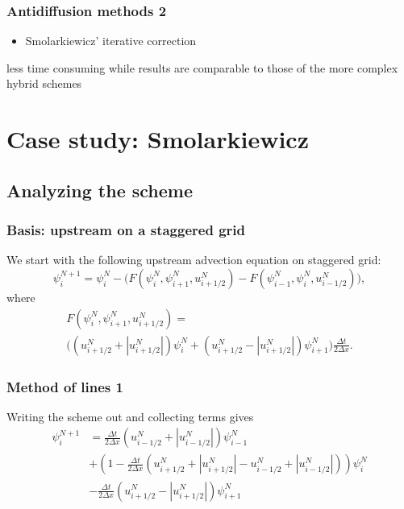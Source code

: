 \documentclass[hyperref={pdfstartview=Fit}]{beamer}
\providecommand{\abs}[1]{\left\lvert#1\right\rvert}
\begin{document}
\begin{frame}
\frametitle{Antidiffusion methods 2}
\begin{itemize}
\item Smolarkiewicz' iterative correction
\end{itemize}
   less time consuming while results are comparable to those of the more complex hybrid schemes
\end{frame}

\section{Case study: Smolarkiewicz}
\subsection{Analyzing the scheme}

\begin{frame}
\frametitle{Basis: upstream on a staggered grid}
We start with the following upstream advection equation on staggered grid:
\begin{equation*}
 \psi_i^{N+1} = \psi_i^N - \Big( F \left( \psi_i^N,\psi_{i+1}^N,u_{i+1/2}^N\right)
-F \left( \psi_{i-1}^N,\psi_{i}^N,u_{i-1/2}^N\right) \Big),
\end{equation*}
where
\begin{multline*}
F \left( \psi_i^N,\psi_{i+1}^N,u_{i+1/2}^N\right) =\\
\Big( \left( u_{i+1/2}^N + \abs{u_{i+1/2}^N} \right) \psi_i^N
+ \left( u_{i+1/2}^N - \abs{u_{i+1/2}^N} \right) \psi_{i+1}^N \Big)
\frac{\Delta t}{2 \Delta x}.
\end{multline*}
\end{frame}

\begin{frame}
\frametitle{Method of lines 1}
Writing the scheme out and collecting terms gives
\begin{equation*}
\begin{split}
\psi_i^{N+1} &=
\frac{\Delta t}{2 \Delta x} \left( u_{i-1/2}^N + \abs{u_{i-1/2}^N} \right) \psi_{i-1}^N\\
&+ \left(1 - \frac{\Delta t}{2 \Delta x} \left( u_{i+1/2}^N + \abs{u_{i+1/2}^N} - u_{i-1/2}^N + \abs{u_{i-1/2}^N} \right) \right) \psi_i^N\\
&-\frac{\Delta t}{2 \Delta x} \left( u_{i+1/2}^N - \abs{u_{i+1/2}^N} \right) \psi_{i+1}^N
\end{split}
\end{equation*}
\end{frame}
\end{document}
